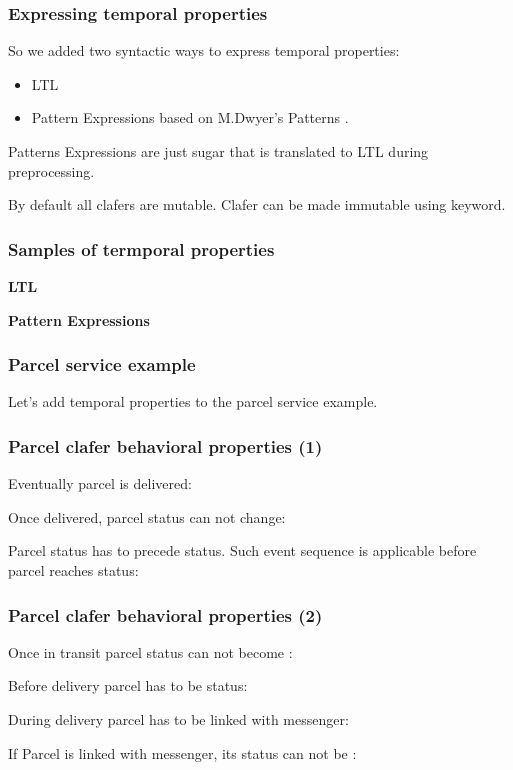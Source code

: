 \documentclass[xcolor=dvipsnames,mathserif,12pt,backend=biber]{beamer}
\begin{document}
  \begin{frame}
    \frametitle{Expressing temporal properties}
    So we added two syntactic ways to express temporal properties: 
    \begin{itemize}
      \item LTL 
      \item Pattern Expressions based on M.Dwyer's Patterns . 
    \end{itemize}
    Patterns Expressions are just sugar that is translated to LTL during preprocessing.

    By default all clafers are mutable. Clafer can be made immutable using  keyword.
  \end{frame}
  
  \begin{frame}
    \frametitle{Samples of termporal properties}
    \textbf{LTL}
    
    \textbf{Pattern Expressions}
    
  \end{frame}


  \begin{frame}
    \frametitle{Parcel service example}
    Let's add temporal properties to the parcel service example.
    
  \end{frame}

  \begin{frame}
    \frametitle{Parcel clafer behavioral properties (1)}
    Eventually parcel is delivered:
    
    Once delivered, parcel status can not change:
    
    Parcel  status has to precede  status. Such event sequence is applicable before parcel reaches  status:
    
  \end{frame}

  \begin{frame}
    \frametitle{Parcel clafer behavioral properties (2)}
    Once in transit parcel status can not become :
    
    Before delivery parcel has to be  status:
    
    During delivery parcel has to be linked with messenger:
    
    If Parcel is linked with messenger, its status can not be :
    
  \end{frame}
  
\end{document}
